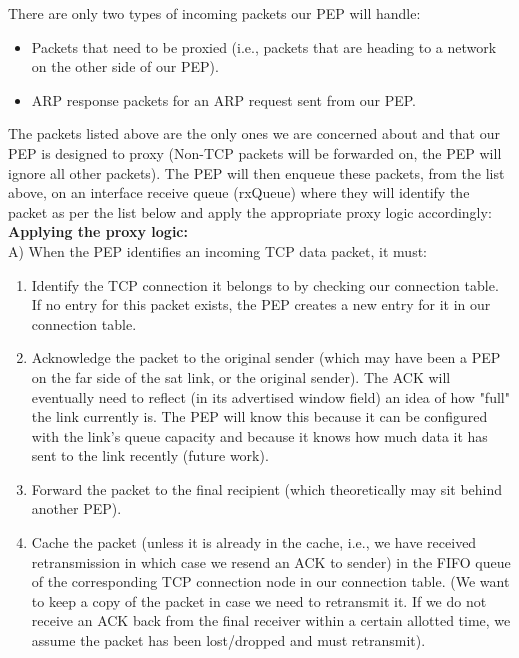 \documentclass{uathesis}
\begin{document}
There are only two types of incoming packets our PEP will handle:\\
\begin{itemize}
\item Packets that need to be proxied (i.e., packets that are heading to a network on the other side of our PEP).
\item ARP response packets for an ARP request sent from our PEP. \\
\end{itemize}

The packets listed above are the only ones we are concerned about and that our PEP is designed to proxy (Non-TCP packets will be forwarded on, the PEP will ignore all other packets). The PEP will then enqueue these packets, from the list above, on an interface receive queue (rxQueue) where they will identify the packet as per the list below and apply the appropriate proxy logic accordingly:\\

\noindent \textbf{Applying the proxy logic:} \\

\noindent A) When the PEP identifies an incoming TCP data packet, it must:\\ 

\begin{enumerate} 
\item Identify the TCP connection it belongs to by checking our connection table. If no entry for this packet exists, the PEP creates a new entry for it in our connection table. \\
\item Acknowledge the packet to the original sender (which may have been a PEP on the far side of the sat link, or the original sender). The ACK will eventually need to reflect (in its advertised window field) an idea of how "full" the link currently is. The PEP will know this because it can be configured with the link's queue capacity and because it knows how much data it has sent to the link recently (future work). \\
\item Forward the packet to the final recipient (which theoretically may sit behind another PEP). \\
\item Cache the packet (unless it is already in the cache, i.e., we have received retransmission in which case we resend an ACK to sender) in the FIFO queue of the corresponding TCP connection node in our connection table. (We want to keep a copy of the packet in case we need to retransmit it. If we do not receive an ACK back from the final receiver within a certain allotted time, we assume the packet has been lost/dropped and must retransmit).\\
\end{enumerate}
\end{document}
